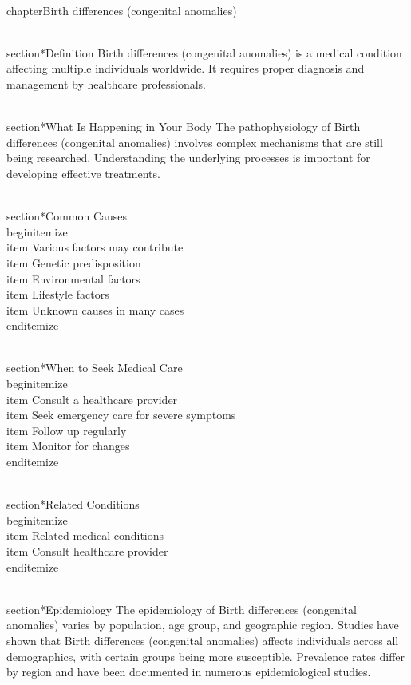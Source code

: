 
\\chapter{Birth differences (congenital anomalies)}

\\section*{Definition}
Birth differences (congenital anomalies) is a medical condition affecting multiple individuals worldwide. It requires proper diagnosis and management by healthcare professionals.

\\section*{What Is Happening in Your Body}
The pathophysiology of Birth differences (congenital anomalies) involves complex mechanisms that are still being researched. Understanding the underlying processes is important for developing effective treatments.

\\section*{Common Causes}
\\begin{itemize}
\\item Various factors may contribute\n  \\item Genetic predisposition\n  \\item Environmental factors\n  \\item Lifestyle factors\n  \\item Unknown causes in many cases
\\end{itemize}

\\section*{When to Seek Medical Care}
\\begin{itemize}
\\item Consult a healthcare provider\n  \\item Seek emergency care for severe symptoms\n  \\item Follow up regularly\n  \\item Monitor for changes
\\end{itemize}

\\section*{Related Conditions}
\\begin{itemize}
\\item Related medical conditions\n  \\item Consult healthcare provider
\\end{itemize}

\\section*{Epidemiology}
The epidemiology of Birth differences (congenital anomalies) varies by population, age group, and geographic region. Studies have shown that Birth differences (congenital anomalies) affects individuals across all demographics, with certain groups being more susceptible. Prevalence rates differ by region and have been documented in numerous epidemiological studies.

